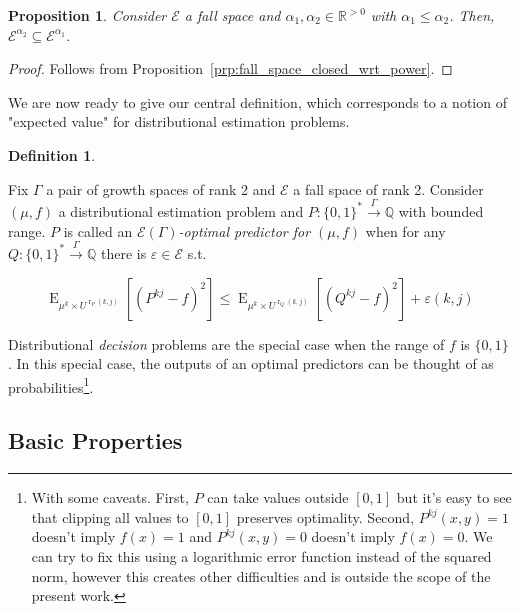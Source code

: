 \documentclass{article}
\numberwithin{equation}{section}
\theoremstyle{definition}
\newtheorem{definition}{Definition}[section]
\theoremstyle{plain}
\newtheorem{proposition}{Proposition}[section]
\newcommand{\Words}{{\{ 0, 1 \}^*}}
\newcommand{\Bool}{\{0,1\}}
\DeclareMathOperator{\E}{E}
\DeclareMathOperator{\R}{r}
\newcommand{\Rats}{\mathbb{Q}}
\newcommand{\Reals}{\mathbb{R}}
\begin{document}
\begin{proposition}

Consider $\mathcal{E}$ a fall space and $\alpha_1,\alpha_2 \in \Reals^{>0}$ with $\alpha_1 \leq \alpha_2$. Then, ${\mathcal{E}^{\alpha_2} \subseteq \mathcal{E}^{\alpha_1}}$.

\end{proposition}

\begin{proof}

Follows from Proposition~\ref{prp:fall_space_closed_wrt_power}.

\end{proof}

We are now ready to give our central definition, which corresponds to a notion of "expected value" for distributional estimation problems.

\begin{definition}
\label{def:op}

Fix $\Gamma$ a pair of growth spaces of rank 2 and $\mathcal{E}$ a fall space of rank 2. Consider $(\mu,f)$ a distributional estimation problem and $P: \Words \xrightarrow{\Gamma} \Rats$ with bounded range. $P$ is called an \emph{$\mathcal{E}(\Gamma)$-optimal predictor for $(\mu,f)$} when for any $Q: \Words \xrightarrow{\Gamma} \Rats$ there is $\varepsilon \in \mathcal{E}$ s.t.

\begin{equation}
\label{eqn:op}
\E_{\mu^k \times U^{\R_P(k,j)}}[(P^{kj} - f)^2] \leq \E_{\mu^k \times U^{\R_Q(k,j)}}[(Q^{kj} - f)^2] + \varepsilon(k,j)
\end{equation}

\end{definition}

Distributional \emph{decision} problems are the special case when the range of $f$ is $\Bool$. In this special case, the outputs of an optimal predictors can be thought of as probabilities\footnote{With some caveats. First, $P$ can take values outside $[0,1]$ but it's easy to see that clipping all values to $[0,1]$ preserves optimality. Second, $P^{kj}(x,y)=1$ doesn't imply $f(x) = 1$ and $P^{kj}(x,y)=0$ doesn't imply $f(x)=0$. We can try to fix this using a logarithmic error function instead of the squared norm, however this creates other difficulties and is outside the scope of the present work.}.

\subsection{Basic Properties}
\end{document}
